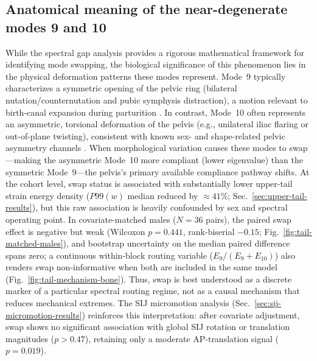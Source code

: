 \documentclass[11pt]{article}
\begin{document}
\subsection*{Anatomical meaning of the near-degenerate modes 9 and 10}
While the spectral gap analysis provides a rigorous mathematical framework for identifying mode swapping, the biological significance of this phenomenon lies in the physical deformation patterns these modes represent.
Mode~9 typically characterizes a symmetric opening of the pelvic ring (bilateral nutation/counternutation and pubic symphysis distraction), a motion relevant to birth-canal expansion during parturition \citep{Whitcome2017,BiomechPregnancy2022}.
In contrast, Mode~10 often represents an asymmetric, torsional deformation of the pelvis (e.g., unilateral iliac flaring or out-of-plane twisting), consistent with known sex- and shape-related pelvic asymmetry channels \citep{Ruff2017,Weiss2020}.
When morphological variation causes these modes to swap---making the asymmetric Mode~10 more compliant (lower eigenvalue) than the symmetric Mode~9---the pelvis's primary available compliance pathway shifts.
At the cohort level, swap status is associated with substantially lower upper-tail strain energy density ($P99(w)$ median reduced by $\approx 41\%$; Sec.~\ref{sec:upper-tail-results}), but this raw association is heavily confounded by sex and spectral operating point.
In covariate-matched males ($N=36$ pairs), the paired swap effect is negative but weak (Wilcoxon $p=0.441$, rank-biserial $-0.15$; Fig.~\ref{fig:tail-matched-males}), and bootstrap uncertainty on the median paired difference spans zero; a continuous within-block routing variable ($E_9/(E_9{+}E_{10})$) also renders swap non-informative when both are included in the same model (Fig.~\ref{fig:tail-mechanism-bone}).
Thus, swap is best understood as a discrete marker of a particular spectral routing regime, not as a causal mechanism that reduces mechanical extremes.
The SIJ micromotion analysis (Sec.~\ref{sec:sij-micromotion-results}) reinforces this interpretation: after covariate adjustment, swap shows no significant association with global SIJ rotation or translation magnitudes ($p>0.47$), retaining only a moderate AP-translation signal ($p=0.019$).
\end{document}
